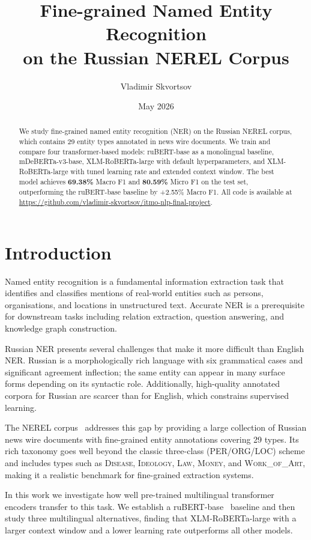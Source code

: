 \documentclass{article}
\title{Fine-grained Named Entity Recognition\\on the Russian NEREL Corpus}
\author{Vladimir Skvortsov}
\date{May 2026}
\begin{document}
\maketitle

\begin{abstract}
We study fine-grained named entity recognition (NER) on the Russian NEREL corpus,
which contains 29 entity types annotated in news wire documents.
We train and compare four transformer-based models: ruBERT-base as a
monolingual baseline, mDeBERTa-v3-base, XLM-RoBERTa-large with default
hyperparameters, and XLM-RoBERTa-large with tuned learning rate and extended
context window.
The best model achieves \textbf{69.38\%} Macro F1 and \textbf{80.59\%}
Micro F1 on the test set, outperforming the ruBERT-base baseline by
+2.55\% Macro F1.
All code is available at
\url{https://github.com/vladimir-skvortsov/itmo-nlp-final-project}.
\end{abstract}

\section{Introduction}

Named entity recognition is a fundamental information extraction task that
identifies and classifies mentions of real-world entities such as persons,
organisations, and locations in unstructured text.
Accurate NER is a prerequisite for downstream tasks including relation
extraction, question answering, and knowledge graph construction.

Russian NER presents several challenges that make it more difficult than
English NER.
Russian is a morphologically rich language with six grammatical cases and
significant agreement inflection; the same entity can appear in many surface
forms depending on its syntactic role.
Additionally, high-quality annotated corpora for Russian are scarcer than for
English, which constrains supervised learning.

The NEREL corpus~\cite{loukachevitch2021nerel} addresses this gap by providing
a large collection of Russian news wire documents with fine-grained entity
annotations covering 29 types.
Its rich taxonomy goes well beyond the classic three-class (PER/ORG/LOC) scheme
and includes types such as \textsc{Disease}, \textsc{Ideology}, \textsc{Law},
\textsc{Money}, and \textsc{Work\_of\_Art}, making it a realistic benchmark for
fine-grained extraction systems.

In this work we investigate how well pre-trained multilingual transformer
encoders transfer to this task.
We establish a ruBERT-base~\cite{kuratov2019rubert} baseline and then study
three multilingual alternatives, finding that XLM-RoBERTa-large
\cite{conneau2020xlmr} with a larger context window and a lower learning rate
outperforms all other models.
\end{document}
